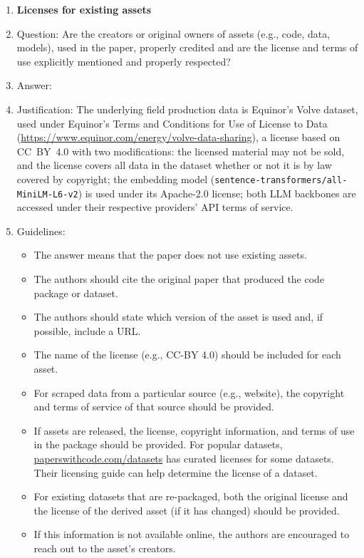 \begin{enumerate}
\item {\bf Licenses for existing assets}
    \item[] Question: Are the creators or original owners of assets (e.g., code, data, models), used in the paper, properly credited and are the license and terms of use explicitly mentioned and properly respected?
    \item[] Answer: \answerYes{}
    \item[] Justification: The underlying field production data is Equinor's Volve dataset, used under Equinor's Terms and Conditions for Use of License to Data (\url{https://www.equinor.com/energy/volve-data-sharing}), a license based on CC~BY~4.0 with two modifications: the licensed material may not be sold, and the license covers all data in the dataset whether or not it is by law covered by copyright; the embedding model (\texttt{sentence-transformers/all-MiniLM-L6-v2}) is used under its Apache-2.0 license; both LLM backbones are accessed under their respective providers' API terms of service.
    \item[] Guidelines:
    \begin{itemize}
        \item The answer \answerNA{} means that the paper does not use existing assets.
        \item The authors should cite the original paper that produced the code package or dataset.
        \item The authors should state which version of the asset is used and, if possible, include a URL.
        \item The name of the license (e.g., CC-BY 4.0) should be included for each asset.
        \item For scraped data from a particular source (e.g., website), the copyright and terms of service of that source should be provided.
        \item If assets are released, the license, copyright information, and terms of use in the package should be provided. For popular datasets, \url{paperswithcode.com/datasets} has curated licenses for some datasets. Their licensing guide can help determine the license of a dataset.
        \item For existing datasets that are re-packaged, both the original license and the license of the derived asset (if it has changed) should be provided.
        \item If this information is not available online, the authors are encouraged to reach out to the asset's creators.
    \end{itemize}


\end{enumerate}
